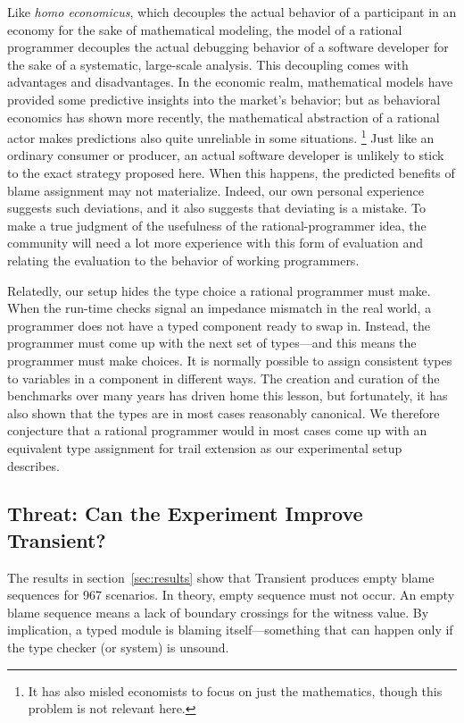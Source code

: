 Like {\em homo economicus\/}, which decouples the actual behavior of a
participant in an economy for the sake of mathematical modeling, the model of a
rational programmer decouples the actual debugging behavior of a software
developer for the sake of a systematic, large-scale analysis. This decoupling
comes with advantages and disadvantages. In the economic realm, mathematical models
have provided some predictive insights into the market's behavior; but as
behavioral economics has shown more recently, the mathematical abstraction of a
rational actor makes predictions also quite unreliable in some situations.
\footnote{It has also misled economists to focus on just the mathematics, though
this problem is not relevant here.}  Just like an ordinary consumer or producer,
an actual software developer is unlikely to stick to the exact strategy proposed
here. When this happens, the predicted benefits of blame assignment may not
materialize. Indeed, our own personal experience suggests such deviations, and
it also suggests that deviating is a mistake. To make a true judgment of the
usefulness of the rational-programmer idea, the community will need a lot more
experience with this form of evaluation and relating the evaluation to the
behavior of working programmers.

Relatedly, our setup hides the type choice a rational programmer must make. When the
run-time checks signal an impedance mismatch in the real world, a programmer
does not have a typed component ready to swap in. Instead, the programmer must
come up with the next set of types---and this means the programmer must make
choices. It is normally possible to assign consistent types to variables in a
component in different ways. The creation and curation of the benchmarks over
many years has driven home this lesson, but fortunately, it has also shown that
the types are in most cases reasonably canonical.  We therefore conjecture that
a rational programmer would in most cases come up with an equivalent type
assignment for trail extension as our experimental setup describes.

\subsection{Threat: Can the Experiment Improve Transient?} \label{sec:threat:transient}

The results in section~\ref{sec:results} show that Transient produces empty
blame sequences for 967 scenarios. In theory, empty sequence must not occur. An
empty blame sequence means a lack of boundary crossings for the witness value.
By implication, a typed module is blaming itself---something that can
happen only if the type checker (or system) is unsound.

